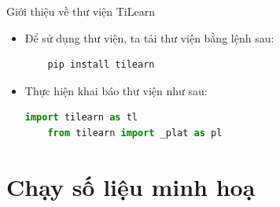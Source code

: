 \documentclass[10pt]{beamer}
\begin{document}
\begin{frame}[fragile]{Giới thiệu về thư viện TiLearn}
\begin{itemize}
\item<1-> Để sử dụng thư viện, ta tải thư viện bằng lệnh sau:
\medskip
\begin{lstlisting}
    pip install tilearn
\end{lstlisting}
\medskip
\item<2-> Thực hiện khai báo thư viện như sau:
\medskip
\begin{lstlisting}[language=Python]
    import tilearn as tl
    from tilearn import _plat as pl
\end{lstlisting}
\end{itemize}

\end{frame}






\section{Chạy số liệu minh hoạ}
\end{document}
